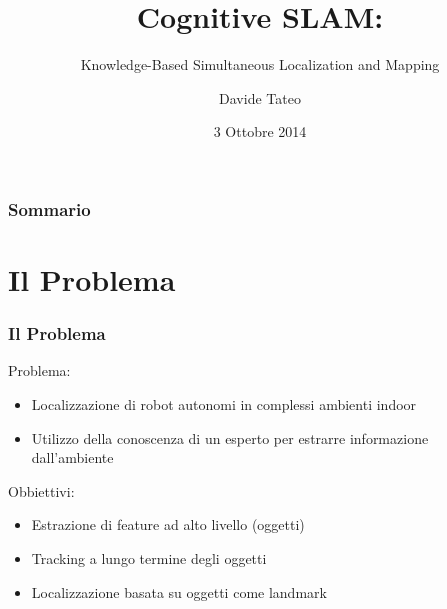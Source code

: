 \documentclass[c]{beamer}
\title[Cognitive SLAM]{Cognitive SLAM:}
\subtitle{Knowledge-Based Simultaneous Localization and Mapping}
\author[Davide Tateo]{Davide Tateo}
\date[03/10/2014]{3 Ottobre 2014}
\begin{document}
\polimititlepage[airlab]
\addtocounter{framenumber}{-1}


\begin{frame}
\frametitle{Sommario}
\tableofcontents
\end{frame}

\section{Il Problema}
\begin{frame}
\frametitle{Il Problema}

Problema:
\begin{itemize}
 \item Localizzazione di robot autonomi in complessi ambienti indoor
 \item Utilizzo della conoscenza di un esperto per estrarre informazione dall'ambiente
\end{itemize}

Obbiettivi:
\begin{itemize}
 \item Estrazione di feature ad alto livello (oggetti)
 \item Tracking a lungo termine degli oggetti
 \item Localizzazione basata su oggetti come landmark 
\end{itemize}

\end{frame}

\end{document}
